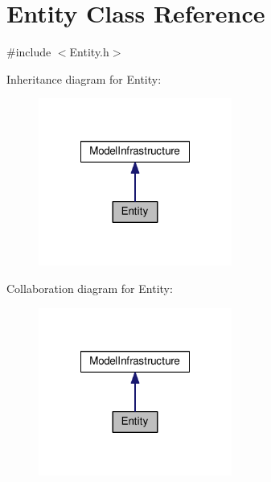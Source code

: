 \hypertarget{class_entity}{\section{Entity Class Reference}
\label{class_entity}
}


{\ttfamily \#include $<$Entity.\-h$>$}



Inheritance diagram for Entity\-:
\nopagebreak
\begin{figure}[H]
\begin{center}
\leavevmode
\includegraphics[width=180pt]{class_entity__inherit__graph}
\end{center}
\end{figure}


Collaboration diagram for Entity\-:
\nopagebreak
\begin{figure}[H]
\begin{center}
\leavevmode
\includegraphics[width=180pt]{class_entity__coll__graph}
\end{center}
\end{figure}
